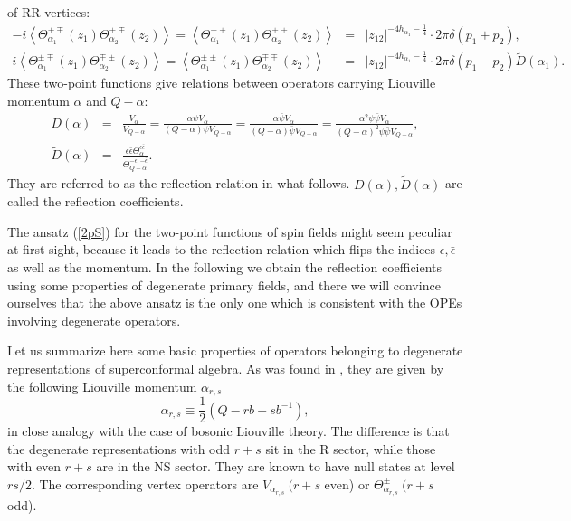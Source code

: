\documentclass[a4paper,12pt]{article}
\def\paragraph#1{
    \vskip6mm\noindent{\it #1}\par\vskip3mm}
\newcommand{\vev}[1]{\left<{#1}\right>}
\newcommand{\mfrac}[2]{{\displaystyle\frac{#1}{#2}}}
\newcommand{\ep}{{\epsilon}}
\newcommand{\bep}{{\bar{\epsilon}}}
\begin{document}
 of RR vertices:
\begin{equation}
\begin{array}{rcl}
    -i\vev{\Theta_{\alpha_1}^{\pm\mp}(z_1)\Theta_{\alpha_2}^{\pm\mp}(z_2)}
 =  \vev{\Theta_{\alpha_1}^{\pm\pm}(z_1)\Theta_{\alpha_2}^{\pm\pm}(z_2)}
 &=& |z_{12}|^{-4h_{\alpha_1}-\frac{1}{4}}\cdot 2\pi \delta(p_1+p_2), \\
     i\vev{\Theta_{\alpha_1}^{\pm\mp}(z_1)\Theta_{\alpha_2}^{\mp\pm}(z_2)}
 =  \vev{\Theta_{\alpha_1}^{\pm\pm}(z_1)\Theta_{\alpha_2}^{\mp\mp}(z_2)}
 &=& |z_{12}|^{-4h_{\alpha_1}-\frac{1}{4}}\cdot
    2\pi\delta(p_1-p_2)\tilde{D}(\alpha_1).
\end{array}
\label{2pS}
\end{equation}
 These two-point functions give relations between operators
 carrying Liouville momentum $\alpha$ and $Q-\alpha$:
\begin{equation}
\begin{array}{rcl}
 D(\alpha)
&=&\mfrac{V_\alpha}{V_{Q-\alpha}}  
 = \mfrac{\alpha\psi V_\alpha}{(Q-\alpha)\psi V_{Q-\alpha}}  
 = \mfrac{\alpha\bar{\psi}V_\alpha}{(Q-\alpha)\bar{\psi}V_{Q-\alpha}}  
 = \mfrac{\alpha^2\psi\bar{\psi}V_\alpha}
        {(Q-\alpha)^2\psi\bar{\psi}V_{Q-\alpha}},\\
 \tilde{D}(\alpha)
&=&\mfrac{\ep\bep\Theta_\alpha^{\ep\bep}}{\Theta_{Q-\alpha}^{-\ep,-\bep}}.
\end{array}
\label{rfc}
\end{equation}
 They are referred to as the reflection relation in what follows.
 $D(\alpha), \tilde{D}(\alpha)$ are called the reflection coefficients.

   The ansatz (\ref{2pS}) for the two-point functions of spin fields
 might seem peculiar at first sight, because it leads to the reflection
 relation which flips the indices $\ep,\bep$ as well as the momentum.
 In the following we obtain the reflection coefficients
 using some properties of degenerate primary fields, and there
 we will convince ourselves that the above ansatz is the only one
 which is consistent with the OPEs involving degenerate operators.

\paragraph{Degenerate fields and their OPEs}
   Let us summarize here some basic properties of
 operators belonging to degenerate representations of
 superconformal algebra.
 As was found in \cite{BKT,FQS,Nam}, they are given by the following
 Liouville momentum $\alpha_{r,s}$
\begin{equation}
  \alpha_{r,s} \equiv \frac{1}{2}(Q-rb-sb^{-1}),
\end{equation}
 in close analogy with the case of bosonic Liouville theory.
 The difference is that the degenerate representations with odd
 $r+s$ sit in the R sector, while those with even $r+s$ are in the
 NS sector.
 They are known to have null states at level $rs/2$.
 The corresponding vertex operators are $V_{\alpha_{r,s}}~(r+s$ even)
 or $\Theta_{\alpha_{r,s}}^\pm~(r+s$ odd).
\end{document}
